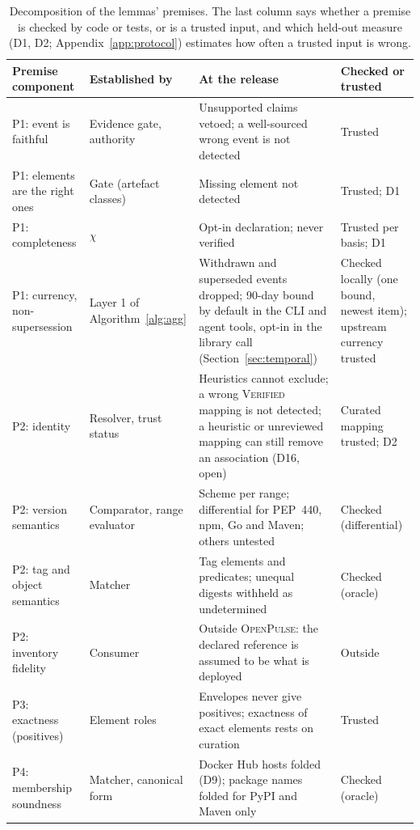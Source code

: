 \documentclass[11pt,a4paper]{article}
\newcommand{\op}{\textsc{OpenPulse}}
\begin{document}
\begin{table}[t]
\centering
\footnotesize
\begin{tabularx}{\linewidth}{@{}>{\raggedright\arraybackslash}p{2.7cm} >{\raggedright\arraybackslash}p{2.3cm} >{\raggedright\arraybackslash}X >{\raggedright\arraybackslash}p{1.9cm}@{}}
\toprule
Premise component & Established by & At the release & Checked or trusted \\
\midrule
P1: event is faithful & Evidence gate, authority & Unsupported claims vetoed; a well-sourced wrong event is not detected & Trusted \\
P1: elements are the right ones & Gate (artefact classes) & Missing element not detected & Trusted; D1 \\
P1: completeness & $\chi$ & Opt-in declaration; never verified & Trusted per basis; D1 \\
P1: currency, non-supersession & Layer 1 of Algorithm~\ref{alg:agg} & Withdrawn and superseded events dropped; 90-day bound by default in the CLI and agent tools, opt-in in the library call (Section~\ref{sec:temporal}) & Checked locally (one bound, newest item); upstream currency trusted \\
P2: identity & Resolver, trust status & Heuristics cannot exclude; a wrong \textsc{Verified} mapping is not detected; a heuristic or unreviewed mapping can still remove an association (D16, open) & Curated mapping trusted; D2 \\
P2: version semantics & Comparator, range evaluator & Scheme per range; differential for PEP~440, npm, Go and Maven; others untested & Checked (differential) \\
P2: tag and object semantics & Matcher & Tag elements and predicates; unequal digests withheld as undetermined & Checked (oracle) \\
P2: inventory fidelity & Consumer & Outside \op{}: the declared reference is assumed to be what is deployed & Outside \\
P3: exactness (positives) & Element roles & Envelopes never give positives; exactness of exact elements rests on curation & Trusted \\
P4: membership soundness & Matcher, canonical form & Docker Hub hosts folded (D9); package names folded for PyPI and Maven only & Checked (oracle) \\
\bottomrule
\end{tabularx}
\caption{Decomposition of the lemmas' premises. The last column says
whether a premise is checked by code or tests, or is a trusted input,
and which held-out measure (D1, D2; Appendix~\ref{app:protocol})
estimates how often a trusted input is wrong.}
\label{tab:premises}
\end{table}
\end{document}
